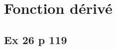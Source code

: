 \documentclass[12pt,a4paper]{book}
\begin{document}


\section*{Fonction dérivé}

\subsection*{Ex 26 p 119}
\end{document}
